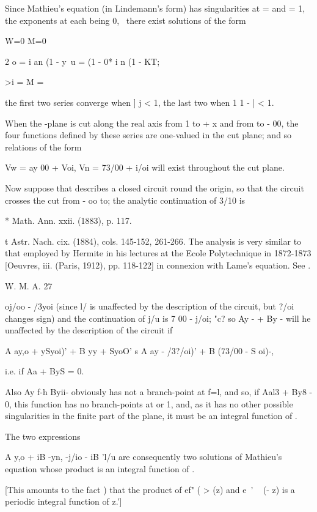 
Since Mathieu's equation (in Lindemann's form) has singularities at =
and = 1, the exponents at each being 0, \, there exist solutions of
the form

W=0 M=0

2 o = i an (1 - y\ u = (1 - 0* i n (1 - KT;

>i = M =

the first two series converge when ] j < 1, the last two when 1 1 - |
< 1.

When the -plane is cut along the real axis from 1 to + x and from to -
00, the four functions defined by these series are one-valued in the
cut plane; and so relations of the form

Vw = ay 00 + Voi, Vn = 73/00 + i/oi will exist throughout the cut
plane.

Now suppose that describes a closed circuit round the origin, so that
the circuit crosses the cut from - oo to; the analytic continuation
of 3/10 is

* Math. Ann. xxii. (1883), p. 117.

t Astr. Nach. cix. (1884), cols. 145-152, 261-266. The analysis is
very similar to that employed by Hermite in his lectures at the Ecole
Polytechnique in 1872-1873 [Oeuvres, iii. (Paris, 1912), pp. 118-122]
in connexion with Lame's equation. See .

W. M. A. 27

%
%

oj/oo - /3yoi (since l/ is unaffected by the description of the
circuit, but ?/oi changes sign) and the continuation of j/u is 7 00 -
j/oi; "c? so Ay - + By - will he unaffected by the description of the
circuit if

A ay,o + ySyoi)' + B yy + SyoO' s A ay - /3?/oi)' + B (73/00 - S oi)-,

i.e. if Aa + ByS = 0.

Also Ay f-h Byii- obviously has not a branch-point at f=l, and so, if
Aal3 + By8 - 0, this function has no branch-points at or 1, and, as it
has no other possible singularities in the finite part of the plane,
it must be an integral function of .

The two expressions

A y,o + iB -yn, -j/io - iB 'l/u are consequently two solutions of
Mathieu's equation whose product is an integral function of .

[This amounts to the fact ) that the product of ef" ( > (z) and
e~' ~ (- z) is a periodic integral function of z.']

